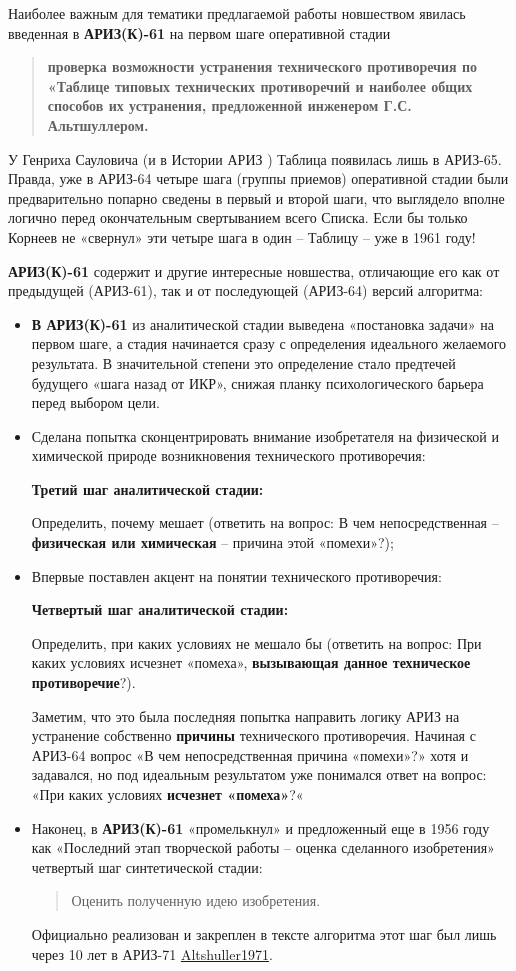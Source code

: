 \documentclass[11pt,a4paper]{article}
\begin{document}
Наиболее важным для тематики предлагаемой работы новшеством явилась введенная
в \textbf{АРИЗ(К)-61} на первом шаге оперативной стадии 
\begin{quote}\bf
  проверка возможности устранения технического противоречия по «Таблице
  типовых технических противоречий и наиболее общих способов их устранения,
  предложенной инженером Г.С. Альтшуллером.
\end{quote}

У Генриха Сауловича (и в Истории АРИЗ \cite{Altshuller1986a}) Таблица
появилась лишь в АРИЗ-65.  Правда, уже в АРИЗ-64 четыре шага (группы приемов)
оперативной стадии были предварительно попарно сведены в первый и второй шаги,
что выглядело вполне логично перед окончательным свертыванием всего Списка.
Если бы только Корнеев не «свернул» эти четыре шага в один -- Таблицу -- уже в
1961 году!

\textbf{АРИЗ(К)-61} содержит и другие интересные новшества, отличающие его как
от предыдущей (АРИЗ-61), так и от последующей (АРИЗ-64) версий алгоритма:
\begin{itemize}
\item \textbf{В АРИЗ(К)-61} из аналитической стадии выведена «постановка
  задачи» на первом шаге, а стадия начинается сразу с определения идеального
  желаемого результата. В значительной степени это определение стало предтечей
  будущего «шага назад от ИКР», снижая планку психологического барьера перед
  выбором цели.
\item Сделана попытка сконцентрировать внимание изобретателя на физической и
  химической природе возникновения технического противоречия:

  \textbf{Третий шаг аналитической стадии:}

  Определить, почему мешает (ответить на вопрос: В чем непосредственная --
  \textbf{физическая или химическая} -- причина этой «помехи»?);
\item Впервые поставлен акцент на понятии технического противоречия:

  \textbf{Четвертый шаг аналитической стадии:}

  Определить, при каких условиях не мешало бы (ответить на вопрос: При каких
  условиях исчезнет «помеха», \textbf{вызывающая данное техническое
    противоречие}?).

  Заметим, что это была последняя попытка направить логику АРИЗ на устранение
  собственно \textbf{причины} технического противоречия. Начиная с АРИЗ-64
  вопрос «В чем непосредственная причина «помехи»?» хотя и задавался, но под
  идеальным результатом уже понимался ответ на вопрос: «При каких условиях
  \textbf{исчезнет «помеха»}?«
\item Наконец, в \textbf{АРИЗ(К)-61} «промелькнул» и предложенный еще в 1956
  году как «Последний этап творческой работы -- оценка сделанного изобретения»
  четвертый шаг синтетической стадии:
  \begin{quote}
    Оценить полученную идею изобретения.
  \end{quote}
  
Официально реализован и закреплен в тексте алгоритма этот шаг был лишь через
10 лет в АРИЗ-71 \url{Altshuller1971}.
\end{itemize}
\end{document}
